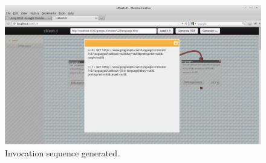 \begin{spacing}{1.5}
\begin{figure}
        \centering
        \includegraphics[scale=0.3]{images/1.png}
        \caption{Invocation sequence generated.}
\end{figure}
\end{spacing}